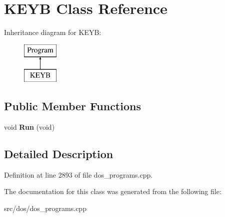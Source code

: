 \hypertarget{classKEYB}{\section{K\-E\-Y\-B Class Reference}
\label{classKEYB}
}
Inheritance diagram for K\-E\-Y\-B\-:\begin{figure}[H]
\begin{center}
\leavevmode
\includegraphics[height=2.000000cm]{classKEYB}
\end{center}
\end{figure}
\subsection*{Public Member Functions}
\begin{DoxyCompactItemize}
\item 
\hypertarget{classKEYB_a0ddb778460bbba0ce194908d8a405d24}{void {\bfseries Run} (void)}\label{classKEYB_a0ddb778460bbba0ce194908d8a405d24}

\end{DoxyCompactItemize}


\subsection{Detailed Description}


Definition at line 2893 of file dos\-\_\-programs.\-cpp.



The documentation for this class was generated from the following file\-:\begin{DoxyCompactItemize}
\item 
src/dos/dos\-\_\-programs.\-cpp\end{DoxyCompactItemize}
